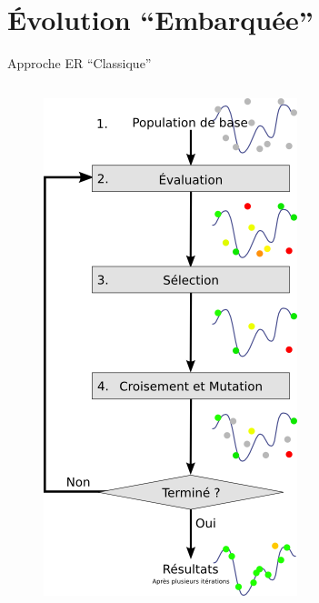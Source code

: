 \documentclass[8pt]{beamer}
\begin{document}
\section{Évolution ``Embarquée''} 
\begin{frame}{Approche ER ``Classique''}

	\begin{columns}
		\begin{figure}
			\centering
			\includegraphics[width=\textwidth]{images/AG}

\end{figure}
\end{columns}
\end{frame}
\end{document}
